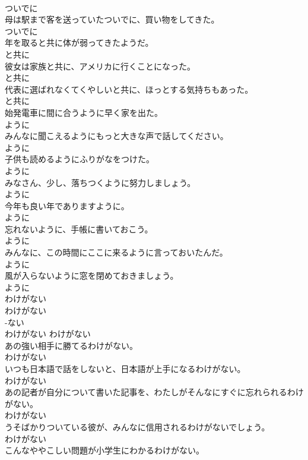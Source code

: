 \documentclass[8pt]{extreport}
\begin{document}
\begin{CJK}{UTF8}{min}
\\	ついでに	
\\	母は駅まで客を送っていたついでに、買い物をしてきた。	
\\	ついでに	
\\	年を取ると共に体が弱ってきたようだ。	
\\	と共に	
\\	彼女は家族と共に、アメリカに行くことになった。	
\\	と共に	
\\	代表に選ばれなくてくやしいと共に、ほっとする気持ちもあった。	
\\	と共に	
\\	始発電車に間に合うように早く家を出た。	
\\	ように	
\\	みんなに聞こえるようにもっと大きな声で話してください。	
\\	ように	
\\	子供も読めるようにふりがなをつけた。	
\\	ように	
\\	みなさん、少し、落ちつくように努力しましょう。	
\\	ように	
\\	今年も良い年でありますように。	
\\	ように	
\\	忘れないように、手帳に書いておこう。	
\\	ように	
\\	みんなに、この時間にここに来るように言っておいたんだ。	
\\	ように	
\\	風が入らないように窓を閉めておきましょう。	
\\	ように	
\\	わけがない	
\\	わけがない	
\\	-ない
\\	わけがない	わけがない	
\\	あの強い相手に勝てるわけがない。	
\\	わけがない	
\\	いつも日本語で話をしないと、日本語が上手になるわけがない。	
\\	わけがない	
\\	あの記者が自分について書いた記事を、わたしがそんなにすぐに忘れられるわけがない。	
\\	わけがない	
\\	うそばかりついている彼が、みんなに信用されるわけがないでしょう。	
\\	わけがない	
\\	こんなややこしい問題が小学生にわかるわけがない。	

\end{CJK}
\end{document}
